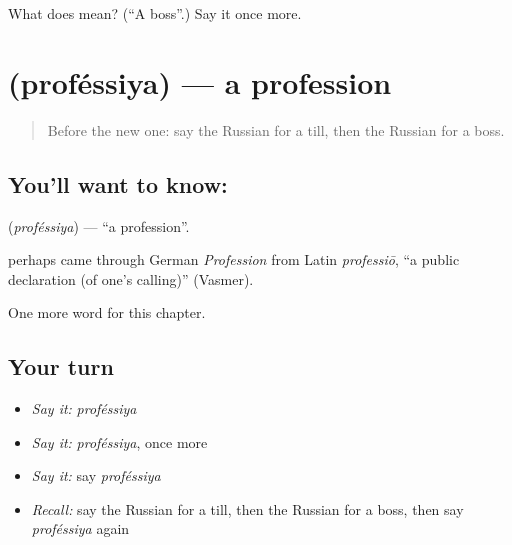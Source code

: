 \begin{tcolorbox}[breakable,colback=teal!4,colframe=teal!35!black,title={Before you move on}]
What does  mean? (\textquotedblleft{}A boss\textquotedblright{}.) Say it once more.
\end{tcolorbox}
\section[\texorpdfstring{\ru{профессия} (proféssiya)}{профессия (proféssiya)}]{ (proféssiya) — a profession}

\label{lesson:RU-C110-profession}



\begin{quote}
Before the new one: say the Russian for a till, then the Russian for a boss.
\end{quote}

\subsection*{You'll want to know: }
\textbf{} (\emph{proféssiya}) — \textquotedblleft{}a profession\textquotedblright{}.

\begin{cousinweb}
\textbf{} perhaps came through German \emph{Profession} from Latin \emph{professiō}, \textquotedblleft{}a public declaration (of one's calling)\textquotedblright{} (Vasmer).
\end{cousinweb}

\begin{grammarlens}[title={What you've built}]
One more word for this chapter.
\end{grammarlens}

\subsection*{Your turn}
\begin{itemize}
\raggedright
  \item \emph{Say it:} \emph{proféssiya}
  \item \emph{Say it:} \emph{proféssiya}, once more
  \item \emph{Say it:} say \emph{proféssiya}
  \item \emph{Recall:} say the Russian for a till, then the Russian for a boss, then say \emph{proféssiya} again
\end{itemize}

